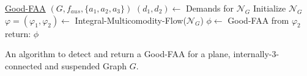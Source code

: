 
\begin{algorithm}
	\underline{Good-FAA} $(G,f_{aus},\{a_1,a_2,a_3\})$\;
		{
		$(d_1,d_2) \longleftarrow$ Demands for $\mathcal{N}_G$ \;
        		Initialize $\mathcal{N}_G$ \;
        		$\varphi = (\varphi_1,\varphi_2) \longleftarrow$ Integral-Multicomodity-Flow($\mathcal{N}_G$) \;
        			{
        			$\phi \longleftarrow$ Good-FAA from $\varphi_2$ \;
			return: $\phi$
			}
		}
		\caption{An algorithm to detect and return a Good-FAA for a plane, internally-3-connected and suspended Graph $G$.}
\end{algorithm}
